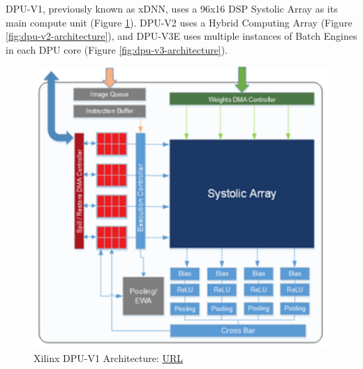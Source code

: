 DPU-V1, previously known as xDNN, uses a 96x16 DSP Systolic Array as its main compute unit (Figure \ref{fig:dpu-v1-architecture}). DPU-V2 uses a Hybrid Computing Array (Figure \ref{fig:dpu-v2-architecture}), and DPU-V3E uses multiple instances of Batch Engines in each DPU core (Figure \ref{fig:dpu-v3-architecture}).

\begin{figure} [H]
	\centering
	\includegraphics[scale=0.6]{Images/Hardware/dpu-v1-architecture.png}
	\decoRule
	\caption[Xilinx DPU-V1 Architecture]{Xilinx DPU-V1 Architecture: \href{https://www.xilinx.com/html_docs/vitis_ai/1_1/zlx1571919192500.html}{URL}}
	\label{fig:dpu-v1-architecture}
\end{figure}

